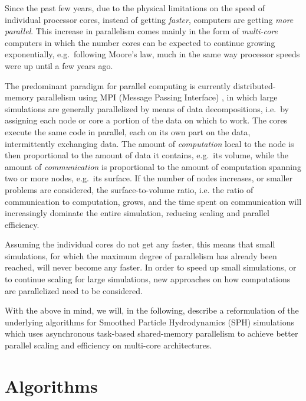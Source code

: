 \documentclass[a4paper,conference]{IEEEtran}
\begin{document}
Since the past few years, due to the physical limitations
on the speed of individual processor cores, instead of
getting {\em faster}, computers are getting {\em more parallel}.
This increase in parallelism comes mainly in the form of
{\em multi-core} computers in which the number cores can be
expected to continue growing exponentially, e.g.~following
Moore's law, much in the same way processor speeds were up until
a few years ago.

The predominant paradigm for parallel
computing is currently distributed-memory parallelism using MPI
(Message Passing Interface) \cite{ref:Snir1998},
in which large simulations are generally
parallelized by means of data decompositions, i.e.~by assigning
each node or core a portion of the data on which to work.
The cores execute the same code
in parallel, each on its own part on the data, intermittently exchanging data.
The amount of {\em computation} local to the node is then proportional
to the amount of data it contains, e.g.~its volume, while
the amount of {\em communication} is proportional to the
amount of computation spanning two or more nodes, e.g.~its
surface.
If the number of nodes increases, or 
smaller problems are considered, the surface-to-volume ratio,
i.e. the ratio of communication to computation,
grows, and the time spent on communication will increasingly
dominate the entire simulation, reducing scaling and parallel
efficiency.

Assuming the individual cores do not get any faster,
this means that small simulations, for which the
maximum degree of parallelism has already been reached, will never
become any faster.
In order to speed up small simulations, or to continue
scaling for large simulations, new approaches on how
computations are parallelized need to be considered.

With the above in mind, we will, in the following,
describe a reformulation of the
underlying algorithms for Smoothed Particle Hydrodynamics (SPH)
simulations which uses asynchronous
task-based shared-memory parallelism to achieve better parallel
scaling and efficiency on multi-core architectures.


\section{Algorithms}
\end{document}

